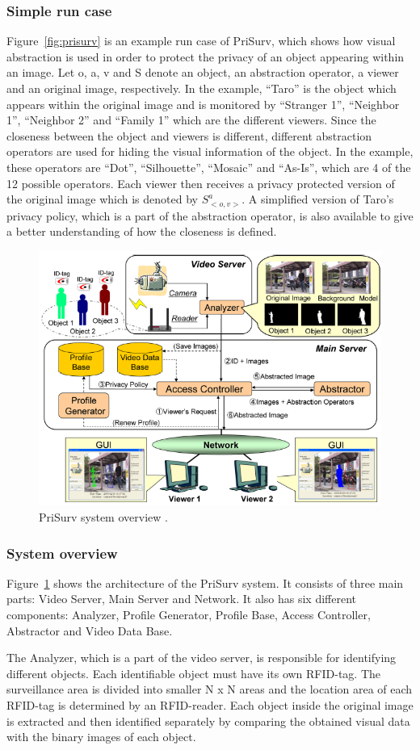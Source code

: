 \documentclass[conference]{IEEEtran}
\begin{document}
\subsubsection{Simple run case}
Figure~\ref{fig:prisurv} is an example run case of PriSurv, which shows how visual abstraction is used in order to protect the privacy of an object appearing within an image. Let o, a, v and S denote an object, an abstraction operator, a viewer and an original image, respectively. In the example, “Taro” is the object which appears within the original image and is monitored by “Stranger 1”, “Neighbor 1”, “Neighbor 2” and “Family 1” which are the different viewers. Since the closeness between the object and viewers is different, different abstraction operators are used for hiding the visual information of the object. In the example, these operators are “Dot”, “Silhouette”, “Mosaic” and “As-Is”, which are 4 of the 12 possible operators. Each viewer then receives a privacy protected version of the original image which is denoted by $S_{<o, v>}^a$. A simplified version of Taro’s privacy policy, which is a part of the abstraction operator, is also available to give a better understanding of how the closeness is defined. 

\begin{figure}[t]
\centerline{\includegraphics[width=.5\textwidth]{img//prisurv_arch.png}}
\caption{PriSurv system overview \cite{chinomi2008PriSurv}.}
\label{fig:prisurv2}
\end{figure}

\subsubsection{System overview}
Figure~\ref{fig:prisurv2} shows the architecture of the PriSurv system. It consists of three main parts: Video Server, Main Server and Network. It also has six different components: Analyzer, Profile Generator, Profile Base, Access Controller, Abstractor and Video Data Base. 

The Analyzer, which is a part of the video server, is responsible for identifying different objects. Each identifiable object must have its own \ac{RFID}-tag. The surveillance area is divided into smaller N x N areas and the location area of each \ac{RFID}-tag is determined by an \ac{RFID}-reader. Each object inside the original image is extracted and then identified separately by comparing the obtained visual data with the binary images of each object. 
\end{document}
